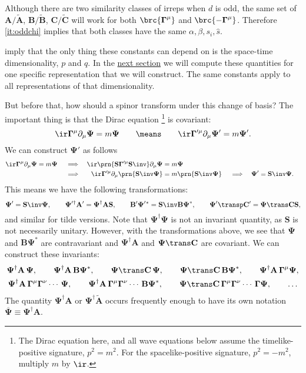 \documentclass[11pt]{article}
\newcommand{\cc}{^\ast}
\newcommand{\hc}{^\dag}
\newcommand{\Gammab}{\boldsymbol{\Gamma}}
\renewcommand{\S}{\mathbf{S}}
\newcommand{\A}{\mathbf{A}}
\newcommand{\B}{\mathbf{B}}
\renewcommand{\C}{\mathbf{C}}
\newcommand{\At}{\widetilde{\A}}
\newcommand{\Bt}{\widetilde{\B}}
\newcommand{\Ct}{\widetilde{\C}}
\newcommand{\Psib}{\boldsymbol{\Psi}}
\newcommand{\sh}{\hat{s}}
\begin{document}
Although there are two similarity classes of irreps when \(d\) is odd, the same set of \(\A/\At\), \(\B/\Bt\), \(\C/\Ct\) will work for both \(\brc{\Gammab^\mu}\) and \(\brc{ -\Gammab^\mu }\).
Therefore \cref{it:oddchi} implies that both classes have the same \(\alpha, \beta, s_i, \sh\).

 imply that the only thing these constants can depend on is the space-time dimensionality, \(p\) and \(q\).
In the \hyperref[sec:explicit]{next section} we will compute these quantities for one specific representation that we will construct.
The same constants apply to all representations of that dimensionality.

But before that, how should a spinor transform under this change of basis?
The important thing is that the Dirac equation%
\footnote{The Dirac equation here, and all wave equations below assume the timelike-positive signature, \(p^2 = m^2\).
For the spacelike-positive signature, \(p^2 = - m^2\), multiply \(m\) by \(\ir\).} 
is covariant:
%
\begin{equation*}
  \ir \Gammab^\mu \partial_\mu \Psib = m \Psib
  \qquad \means \qquad
  \ir \Gammab'^\mu \partial_\mu \Psib' = m \Psib'.
\end{equation*}
%
We can construct \(\Psib'\) as follows
%
\begin{equation*}
\begin{aligned}
  \ir \Gammab^\mu \partial_\mu \Psib &= m \Psib &
  &\implies &
  \ir \prn{\S \Gammab'^\mu \S\inv} \partial_\mu \Psib &= m \Psib \\ &&
  &\implies &
  \ir \Gammab'^\mu \partial_\mu \prn{\S\inv\Psib} &= m \prn{\S\inv\Psib} &
  &\implies &
  \Psib' &= \S\inv \Psib.
\end{aligned}
\end{equation*}
%
This means we have the following transformations:
%
\begin{equation}\label{eq:spinorbasis}
  \Psib' = \S\inv \Psib, \qquad
  \Psib'{}\hc \A' = \Psib\hc \A \S, \qquad
  \B' \Psib'{}\cc = \S\inv \B \Psib\cc, \qquad
  \Psib'\transp \C' = \Psib\trans \C \S,
\end{equation}
%
and similar for tilde versions.
Note that \(\Psib\hc \Psib\) is not an invariant quantity, as \(\S\) is not necessarily unitary.
However, with the transformations above, we see that \(\Psib\) and \(\B \Psib\cc\) are contravariant and \(\Psib\hc\A\) and \(\Psib\trans \C\) are covariant.
We can construct these invariants:
%
\begin{equation}\label{eq:spinorinvt}
\begin{gathered}
  \Psib\hc \A\, \Psib, \qquad
  \Psib\hc \A\, \B \Psib\cc, \qquad
  \Psib\trans \C\, \Psib, \qquad
  \Psib\trans \C\, \B \Psib\cc, \qquad
  \Psib\hc \A\, \Gammab^\mu \Psib, \\
  \Psib\hc \A\, \Gammab^\mu \Gammab^\nu \cdots\, \Psib, \qquad
  \Psib\hc \A\, \Gammab^\mu \Gammab^\nu \cdots\, \B \Psib\cc, \qquad
  \Psib\trans \C\, \Gammab^\mu \Gammab^\nu \cdots\, \Gammab \Psib, \qquad
  \ldots
\end{gathered}
\end{equation}
%
The quantity \( \Psib\hc \A \) or \( \Psib\hc \At \) occurs frequently enough to have its own notation \( \overline{\Psib} \equiv \Psib\hc \A \).
\end{document}

